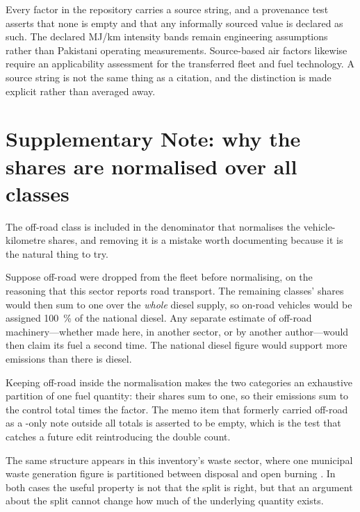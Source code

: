 Every factor in the repository carries a source string, and a provenance test asserts that
none is empty and that any informally sourced value is declared as such. The declared MJ/km intensity bands remain engineering assumptions rather than Pakistani operating measurements. Source-based air factors likewise require an applicability assessment for the transferred fleet and fuel technology. A source string is not the same thing as a citation, and the distinction
is made explicit rather than averaged away.

\section{Supplementary Note: why the shares are normalised over all classes}
\label{app:shares}

The off-road class is included in the denominator that normalises the vehicle-kilometre
shares, and removing it is a mistake worth documenting because it is the natural thing to try.

Suppose off-road were dropped from the fleet before normalising, on the reasoning that this
sector reports road transport. The remaining classes' shares would then sum to one over the
\emph{whole} diesel supply, so on-road vehicles would be assigned \SI{100}{\percent} of the
national diesel. Any separate estimate of off-road machinery---whether made here, in another
sector, or by another author---would then claim its fuel a second time. The national diesel
figure would support more emissions than there is diesel.

Keeping off-road inside the normalisation makes the two categories an exhaustive partition of
one fuel quantity: their shares sum to one, so their emissions sum to the control total times
the factor. The memo item that formerly carried off-road as a \COtwo{}-only note outside all
totals is asserted to be empty, which is the test that catches a future edit reintroducing the
double count.

The same structure appears in this inventory's waste sector, where one municipal waste
generation figure is partitioned between disposal and open burning
\citep{ahmad2026national}. In both cases the useful property is not that the split is right,
but that an argument about the split cannot change how much of the underlying quantity exists.
